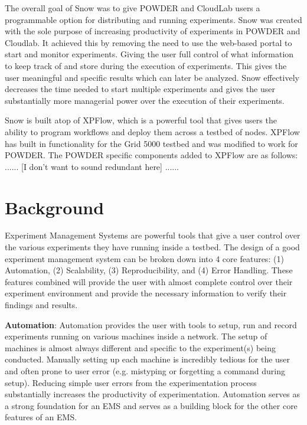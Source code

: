 \documentclass[11pt,twocolumn,letterpaper]{article}
\begin{document}
The overall goal of Snow was to give POWDER and CloudLab users a programmable option for distributing and running experiments.  Snow was created with the sole purpose of increasing productivity of experiments in POWDER and Cloudlab.  It achieved this by removing the need to use the web-based portal to start and monitor experiments.  Giving the user full control of what information to keep track of and store during the execution of experiments.  This gives the user meaningful and specific results which can later be analyzed.  Snow effectively decreases the time needed to start multiple experiments and gives the user substantially more managerial power over the execution of their experiments.

Snow is built atop of XPFlow, which is a powerful tool that gives users the ability to program workflows and deploy them across a testbed of nodes.  XPFlow has built in functionality for the Grid 5000 testbed and was modified to work for POWDER.  The POWDER specific components added to XPFlow are as follows: ...... [I don't want to sound redundant here] ......

\section{Background}

Experiment Management Systems are powerful tools that give a user control over the various experiments they have running inside a testbed.  The design of a good experiment management system can be broken down into 4 core features:
(1) Automation, (2) Scalability, (3) Reproducibility, and (4) Error Handling. These features combined will provide the user with almost complete control over their experiment environment and provide the necessary information to verify their findings and results.

\textbf{Automation}: Automation provides the user with tools to setup, run and record experiments running on various machines inside a network.  The setup of machines is almost always different and specific to the experiment(s) being conducted.  Manually setting up each machine is incredibly tedious for the user and often prone to user error (e.g. mistyping or forgetting a command during setup).  Reducing simple user errors from the experimentation process substantially increases the productivity of experimentation.  Automation serves as a strong foundation for an EMS and serves as a building block for the other core features of an EMS.
\end{document}
